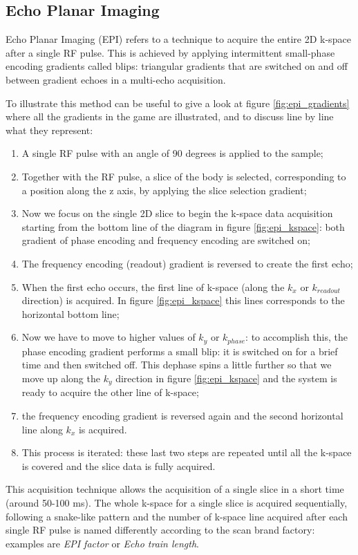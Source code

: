 \documentclass[11pt]{report}
\begin{document}
\subsection{Echo Planar Imaging}\label{sec:epi}
Echo Planar Imaging (EPI) refers to a technique to acquire the entire 2D k-space after a single RF pulse. This is achieved by applying intermittent small-phase encoding gradients called blips: triangular gradients that are switched on and off between gradient echoes in a multi-echo acquisition.

To illustrate this method can be useful to give a look at figure \ref{fig:epi_gradients} where all the gradients in the game are illustrated, and to discuss line by line what they represent:
\begin{enumerate}
\item A single RF pulse with an angle of 90 degrees is applied to the sample;
\item Together with the RF pulse, a slice of the body is selected, corresponding to a position along the z axis, by applying the slice selection gradient;
\item Now we focus on the single 2D slice to begin the k-space data acquisition starting from the bottom line of the diagram in figure \ref{fig:epi_kspace}: both gradient of phase encoding and frequency encoding are switched on;
\item The frequency encoding (readout) gradient is reversed to create the first echo;
\item When the first echo occurs, the first line of k-space (along the $k_x$ or $k_{readout}$ direction) is acquired. In figure \ref{fig:epi_kspace} this lines corresponds to the horizontal bottom line;
\item Now we have to move to higher values of $k_y$ or $k_{phase}$: to accomplish this, the phase encoding gradient performs a small blip: it is switched on for a brief time and then switched off. This dephase spins a little further so that we move up along the $k_y$ direction in figure \ref{fig:epi_kspace} and the system is ready to acquire the other line of k-space;
\item the frequency encoding gradient is reversed again and the second horizontal line along $k_x$ is acquired.
\item This process is iterated: these last two steps are repeated until all the k-space is covered and the slice data is fully acquired.
\end{enumerate}

This acquisition technique allows the acquisition of a single slice in a short time (around 50-100 ms). The whole k-space for a single slice is acquired sequentially, following a snake-like pattern and the number of k-space line acquired after each single RF pulse is named differently according to the scan brand factory: examples are \emph{EPI factor} or \emph{Echo train length}.
\end{document}
